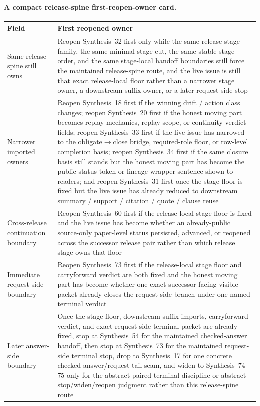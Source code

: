 \documentclass[11pt]{article}
\begin{document}
\paragraph{A compact release-spine first-reopen-owner card.}
\begin{table}[t]
\centering
\small
\begin{tabularx}{\linewidth}{@{}lX@{}}
\toprule
Field & First reopened owner \\
\midrule
Same release spine still owns & Reopen Synthesis~32 first only while the same release-stage family, the same minimal stage cut, the same stable stage order, and the same stage-local handoff boundaries still force the maintained release-spine route, and the live issue is still that exact release-local floor rather than a narrower stage owner, a downstream suffix owner, or a later request-side stop \\
Narrower imported owners & Reopen Synthesis~18 first if the winning drift / action class changes; reopen Synthesis~20 first if the honest moving part becomes replay mechanics, replay scope, or continuity-verdict fields; reopen Synthesis~33 first if the live issue has narrowed to the obligate$\to$close bridge, required-role floor, or row-level completion basis; reopen Synthesis~34 first if the same closure basis still stands but the honest moving part has become the public-status token or lineage-wrapper sentence shown to readers; and reopen Synthesis~31 first once the stage floor is fixed but the live issue has already reduced to downstream summary / support / citation / quote / clause reuse \\
Cross-release continuation boundary & Reopen Synthesis~60 first if the release-local stage floor is fixed and the live issue has become whether an already-public source-only paper-level status persisted, advanced, or reopened across the successor release pair rather than which release stage owns that floor \\
Immediate request-side boundary & Reopen Synthesis~73 first if the release-local stage floor and carryforward verdict are both fixed and the honest moving part has become whether one exact successor-facing visible packet already closes the request-side branch under one named terminal verdict \\
Later answer-side boundary & Once the stage floor, downstream suffix imports, carryforward verdict, and exact request-side terminal packet are already fixed, stop at Synthesis~54 for the maintained checked-answer handoff, then stop at Synthesis~73 for the maintained request-side terminal stop, drop to Synthesis~17 for one concrete checked-answer/request-tail seam, and widen to Synthesis~74--75 only for the abstract paired-terminal discipline or abstract stop/widen/reopen judgment rather than this release-spine route \\

\end{tabularx}
\end{table}
\end{document}
